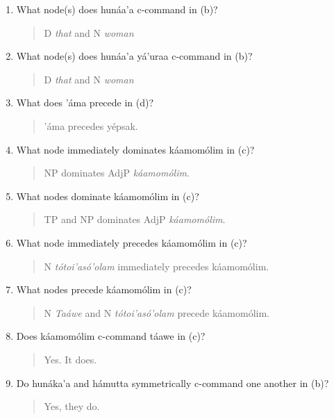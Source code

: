 \documentclass[11pt,notitlepage]{article}
\begin{document}
\begin{enumerate}
\item What node(s) does hunáa’a c-command in (b)?
  
  \begin{quote}
    D \emph{that} and N \emph{woman}
  \end{quote}

\item What node(s) does hunáa’a yá’uraa c-command in (b)?

  \begin{quote}
    D \emph{that} and N \emph{woman}
  \end{quote}

\item What does ’áma precede in (d)?

\begin{quote}
’áma precedes yépsak.
\end{quote}

\item What node immediately dominates káamomólim in (c)?

\begin{quote}
  NP dominates AdjP \emph{káamomólim}.
  \end{quote}

\item What nodes dominate káamomólim in (c)?

\begin{quote}
  TP and NP dominates AdjP \emph{káamomólim}.
  \end{quote}

\item What node immediately precedes káamomólim in (c)?

\begin{quote}
  N \emph{tótoi’asó’olam} immediately precedes káamomólim.
\end{quote}

\item What nodes precede káamomólim in (c)?

  \begin{quote}
   N \emph{Taáwe} and  N \emph{tótoi’asó’olam} precede káamomólim.
  \end{quote}

\item Does káamomólim c-command táawe in (c)?
  
  \begin{quote}
    Yes. It does.
  \end{quote}

\item Do hunáka’a and hámutta symmetrically c-command one another in
(b)?

\begin{quote}
  Yes, they do.
\end{quote}


\end{enumerate}
\end{document}
